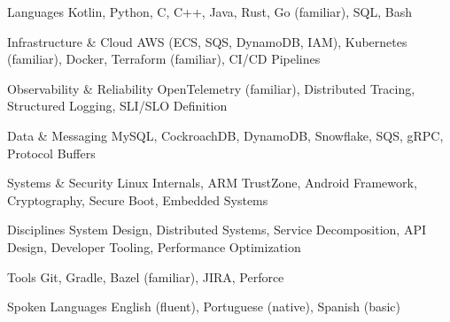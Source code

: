 

\begin{cvskills}

  \cvskill
    {Languages} %
    {Kotlin, Python, C, C++, Java, Rust, Go (familiar), SQL, Bash} %
 
  \cvskill
    {Infrastructure \& Cloud} %
    {AWS (ECS, SQS, DynamoDB, IAM), Kubernetes (familiar), Docker, Terraform (familiar), CI/CD Pipelines} %
 
  \cvskill
    {Observability \& Reliability} %
    {OpenTelemetry (familiar), Distributed Tracing, Structured Logging, SLI/SLO Definition} %
 
  \cvskill
    {Data \& Messaging} %
    {MySQL, CockroachDB, DynamoDB, Snowflake, SQS, gRPC, Protocol Buffers} %
 
  \cvskill
    {Systems \& Security} %
    {Linux Internals, ARM TrustZone, Android Framework, Cryptography, Secure Boot, Embedded Systems} %
 
  \cvskill
    {Disciplines} %
    {System Design, Distributed Systems, Service Decomposition, API Design, Developer Tooling, Performance Optimization} %
 
  \cvskill
    {Tools} %
    {Git, Gradle, Bazel (familiar), JIRA, Perforce} %
 
  \cvskill
    {Spoken Languages} %
    {English (fluent), Portuguese (native), Spanish (basic)} %

\end{cvskills}
